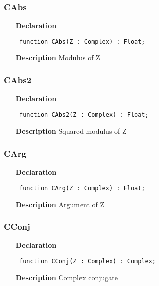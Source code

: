 \documentclass[12pt,a4paper,oneside]{report}
\newcommand{\declarationitem}[1]{\textbf{#1}}
\newcommand{\descriptiontitle}[1]{\textbf{#1}}
\newcommand{\code}[1]{\texttt{#1}}
\begin{document}
\subsubsection{CAbs}
\label{ucomplex-CAbs}
\begin{itemize}\item[\declarationitem{Declaration}\hfill]
\begin{flushleft}
\code{
function CAbs(Z : Complex) : Float;}

\end{flushleft}

\par
\item[\descriptiontitle{Description}]
Modulus of Z

\end{itemize}
\subsubsection{CAbs2}
\label{ucomplex-CAbs2}
\begin{itemize}\item[\declarationitem{Declaration}\hfill]
\begin{flushleft}
\code{
function CAbs2(Z : Complex) : Float;}

\end{flushleft}

\par
\item[\descriptiontitle{Description}]
Squared modulus of Z

\end{itemize}
\subsubsection{CArg}
\label{ucomplex-CArg}
\begin{itemize}\item[\declarationitem{Declaration}\hfill]
\begin{flushleft}
\code{
function CArg(Z : Complex) : Float;}

\end{flushleft}

\par
\item[\descriptiontitle{Description}]
Argument of Z

\end{itemize}
\subsubsection{CConj}
\label{ucomplex-CConj}
\begin{itemize}\item[\declarationitem{Declaration}\hfill]
\begin{flushleft}
\code{
function CConj(Z : Complex) : Complex;}

\end{flushleft}

\par
\item[\descriptiontitle{Description}]
Complex conjugate

\end{itemize}
\end{document}
